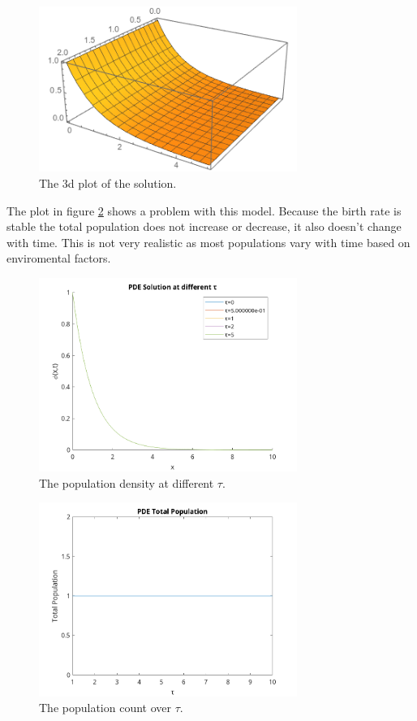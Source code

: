\documentclass[paper=a4, fontsize=11pt]{scrartcl} %
\numberwithin{equation}{section} %
\numberwithin{figure}{section} %
\numberwithin{table}{section} %
\begin{document}
\begin{figure}[H]\label{prob2:3d}
	\centering
	\includegraphics[width=0.75\textwidth]{bvp2}
	\caption{The 3d plot of the solution.}
\end{figure}

The plot in figure \ref{prob2:tau} shows a problem with this model. Because the birth rate is stable the total population does not increase or decrease, it also doesn't change with time. This is not very realistic as most populations vary with time based on enviromental factors.

\begin{figure}[H]\label{prob2:tau}
	\centering
	\includegraphics[width=0.75\textwidth]{prob2}
	\caption{The population density at different $\tau$.}
\end{figure}
\begin{figure}[H]\label{prob2:pop}
	\centering
	\includegraphics[width=0.75\textwidth]{prob2-pop}
	\caption{The population count over $\tau$.}
\end{figure}
\end{document}
